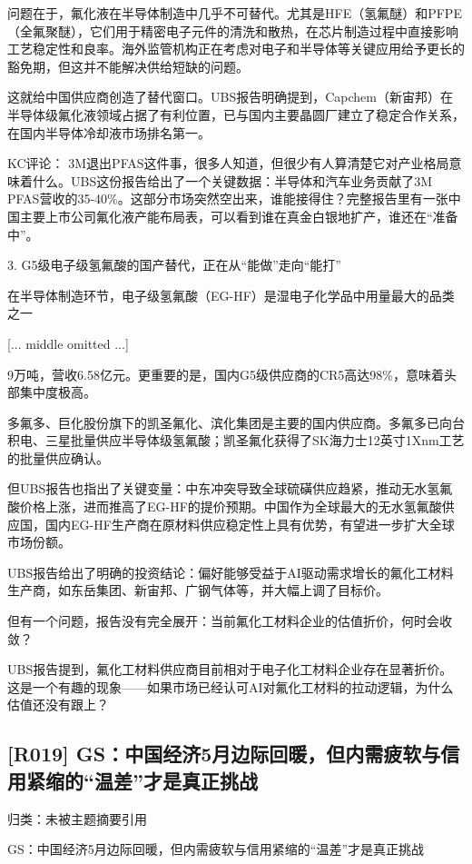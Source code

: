 \documentclass[11pt]{ctexart}
\begin{document}
问题在于，氟化液在半导体制造中几乎不可替代。尤其是HFE（氢氟醚）和PFPE（全氟聚醚），它们用于精密电子元件的清洗和散热，在芯片制造过程中直接影响工艺稳定性和良率。海外监管机构正在考虑对电子和半导体等关键应用给予更长的豁免期，但这并不能解决供给短缺的问题。

这就给中国供应商创造了替代窗口。UBS报告明确提到，Capchem（新宙邦）在半导体级氟化液领域占据了有利位置，已与国内主要晶圆厂建立了稳定合作关系，在国内半导体冷却液市场排名第一。

KC评论： 3M退出PFAS这件事，很多人知道，但很少有人算清楚它对产业格局意味着什么。UBS这份报告给出了一个关键数据：半导体和汽车业务贡献了3M PFAS营收的35-40\%。这部分市场突然空出来，谁能接得住？完整报告里有一张中国主要上市公司氟化液产能布局表，可以看到谁在真金白银地扩产，谁还在“准备中”。

3. G5级电子级氢氟酸的国产替代，正在从“能做”走向“能打”

在半导体制造环节，电子级氢氟酸（EG-HF）是湿电子化学品中用量最大的品类之一

[... middle omitted ...]

9万吨，营收6.58亿元。更重要的是，国内G5级供应商的CR5高达98\%，意味着头部集中度极高。

多氟多、巨化股份旗下的凯圣氟化、滨化集团是主要的国内供应商。多氟多已向台积电、三星批量供应半导体级氢氟酸；凯圣氟化获得了SK海力士12英寸1Xnm工艺的批量供应确认。

但UBS报告也指出了关键变量：中东冲突导致全球硫磺供应趋紧，推动无水氢氟酸价格上涨，进而推高了EG-HF的提价预期。中国作为全球最大的无水氢氟酸供应国，国内EG-HF生产商在原材料供应稳定性上具有优势，有望进一步扩大全球市场份额。

UBS报告给出了明确的投资结论：偏好能够受益于AI驱动需求增长的氟化工材料生产商，如东岳集团、新宙邦、广钢气体等，并大幅上调了目标价。

但有一个问题，报告没有完全展开：当前氟化工材料企业的估值折价，何时会收敛？

UBS报告提到，氟化工材料供应商目前相对于电子化工材料企业存在显著折价。这是一个有趣的现象——如果市场已经认可AI对氟化工材料的拉动逻辑，为什么估值还没有跟上？

\subsection{[R019] GS：中国经济5月边际回暖，但内需疲软与信用紧缩的“温差”才是真正挑战}
{\small\color{refgray}归类：未被主题摘要引用}

GS：中国经济5月边际回暖，但内需疲软与信用紧缩的“温差”才是真正挑战
\end{document}
